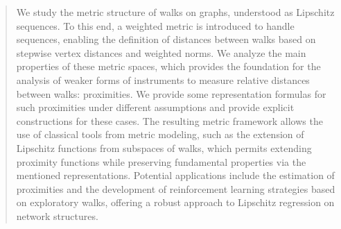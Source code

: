 \documentclass[preprint,12pt]{elsarticle}
\begin{document}
\begin{frontmatter}
\begin{abstract}
We study the metric structure of walks on graphs, understood as Lipschitz sequences. To this end, a weighted metric is introduced to handle sequences, enabling the definition of distances between walks based on stepwise vertex distances and weighted norms. We analyze the main properties of these metric spaces, which provides the foundation for the analysis of weaker forms of instruments to measure relative distances between walks: proximities. We provide some representation formulas for such proximities under different assumptions and provide explicit constructions for these cases. The resulting metric framework allows the use of classical tools from metric modeling, such as the extension of Lipschitz functions from subspaces of walks, which permits extending proximity functions while preserving fundamental properties via the mentioned representations. Potential applications include the estimation of proximities and the development of reinforcement learning strategies based on exploratory walks, offering a robust approach to Lipschitz regression on network structures.
\end{abstract}




\end{frontmatter}
\end{document}
